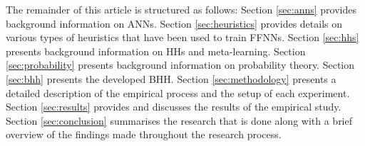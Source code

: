 The remainder of this article is structured as follows: Section  \ref{sec:anns} provides background information on \acp{ANN}. Section  \ref{sec:heuristics} provides details on various types of heuristics that have been used to train \acp{FFNN}. Section  \ref{sec:hhs} presents background information on \acp{HH} and meta-learning. Section  \ref{sec:probability} presents background information on probability theory. Section  \ref{sec:bhh} presents the developed \Acs{BHH}. Section  \ref{sec:methodology} presents a detailed description of the empirical process and the setup of each experiment. Section  \ref{sec:results} provides and discusses the results of the empirical study. Section  \ref{sec:conclusion} summarises the research that is done along with a brief overview of the findings made throughout the research process.
